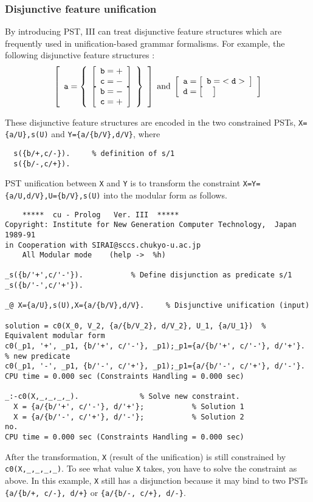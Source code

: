 \subsubsection{Disjunctive feature unification}
By introducing PST, \cuprolog III can treat disjunctive feature
structures which are frequently used in unification-based grammar
formalisms.
For example, the following disjunctive feature structures \cite{eis:uni}:
\[
\left[ \begin{array}{l}
	{\tt a} = \left \{ \begin{array}{l}
	\left[ \begin{array}{l} 	{\tt b}={\tt +}\\ {\tt c}={\tt -} \end{array} \right]\\
	\left[ \begin{array}{l} 	{\tt b}={\tt -}\\ {\tt c}={\tt +} \end{array} \right]
	\end{array} \right \}
\end{array} \right]
\; {\rm and} \;
\left[ \begin{array}{l}
	{\tt a}= \left[ \begin{array}{l} {\tt b}={\tt <d>} \end{array} \right]\\
	{\tt d}=\left[ \begin{array}{l} \: \end{array} \right]
\end{array} \right]
\]

These disjunctive feature structures are encoded in the 
two constrained PSTs, {\tt X=\{a/U\},s(U)} and 
{\tt Y=\{a/\{b/V\},d/V\}}, where
\begin{verbatim}
  s({b/+,c/-}).     % definition of s/1
  s({b/-,c/+}).
\end{verbatim}
PST unification between {\tt X} and {\tt Y} is to transform the
constraint  {\tt X=Y=\{a/U,d/V\},U=\{b/V\},s(U)} 
into the modular form as follows.

\begin{verbatim}
	*****  cu - Prolog   Ver. III  *****
Copyright: Institute for New Generation Computer Technology,  Japan 1989-91
in Cooperation with SIRAI@sccs.chukyo-u.ac.jp
	All Modular mode	(help ->  %h)

_s({b/'+',c/'-'}).           % Define disjunction as predicate s/1
_s({b/'-',c/'+'}).

_@ X={a/U},s(U),X={a/{b/V},d/V}.     % Disjunctive unification (input)

solution = c0(X_0, V_2, {a/{b/V_2}, d/V_2}, U_1, {a/U_1})  % Equivalent modular form
c0(_p1, '+', _p1, {b/'+', c/'-'}, _p1);_p1={a/{b/'+', c/'-'}, d/'+'}. % new predicate
c0(_p1, '-', _p1, {b/'-', c/'+'}, _p1);_p1={a/{b/'-', c/'+'}, d/'-'}.
CPU time = 0.000 sec (Constraints Handling = 0.000 sec)

_:-c0(X,_,_,_,_).              % Solve new constraint.
  X = {a/{b/'+', c/'-'}, d/'+'};           % Solution 1
  X = {a/{b/'-', c/'+'}, d/'-'};           % Solution 2
no.
CPU time = 0.000 sec (Constraints Handling = 0.000 sec)
\end{verbatim}

After the transformation, {\tt X} (result of the unification) is still
constrained by {\tt c0(X,\_,\_,\_,\_)}.
To see what value {\tt X} takes, you have to solve the constraint as above.
In this example, {\tt X} still has a disjunction because it may bind
to two PSTs 
{\tt \{a/\{b/+, c/-\}, d/+\}} or {\tt \{a/\{b/-, c/+\}, d/-\}}.


